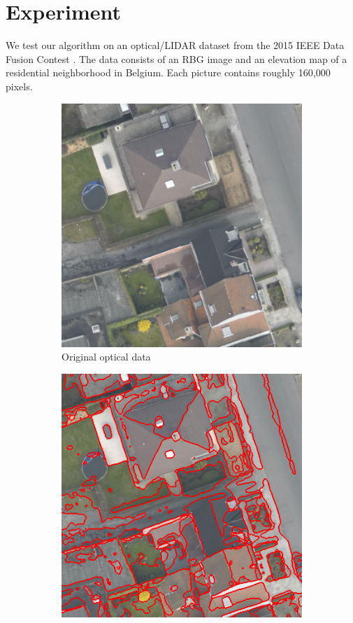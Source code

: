 \documentclass{article}[11pt]
\begin{document}
\section{Experiment}
\label{sec:experiment}

We test our algorithm on an optical/LIDAR dataset from the 2015 IEEE Data Fusion
Contest \cite{7536139}. The data consists of an RBG image and an elevation map
of a residential neighborhood in Belgium. Each picture contains roughly 160,000
pixels.

\begin{figure}[htb]

  
\begin{subfigure}{.33\textwidth}
  \centering
  \includegraphics[width=.8\linewidth]{./Images/DFC2015/optical.png}
  \caption{Original optical data}
  \label{fig:optical}
\end{subfigure}%
\begin{subfigure}{.33\textwidth}
  \centering
  \includegraphics[width=.8\linewidth]{./Images/DFC2015/opticalOnly.png}

\end{subfigure}
\end{figure}
\end{document}

